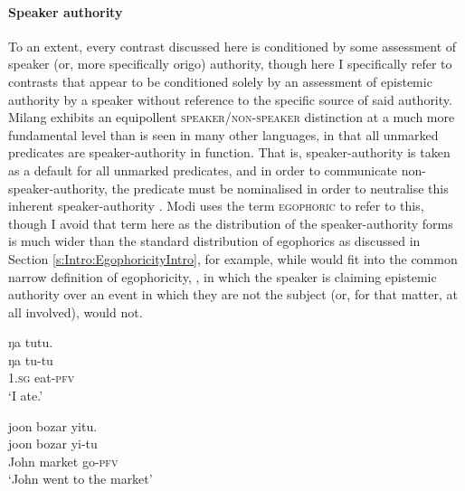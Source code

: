 \paragraph{Speaker authority}
To an extent, every contrast discussed here is conditioned by some assessment of speaker (or, more specifically origo) authority, though here I specifically refer to contrasts that appear to be conditioned solely by an assessment of epistemic authority by a speaker without reference to the specific source of said authority.
Milang \cite[Siangic: India,][]{Modi2017} exhibits an equipollent \textsc{speaker}/\textsc{non-speaker} distinction at a much more fundamental level than is seen in many other languages, in that all unmarked predicates are speaker-authority in function. That is, speaker-authority is taken as a default for all unmarked predicates, and in order to communicate non-speaker-authority, the predicate must be nominalised in order to neutralise this inherent speaker-authority \cite[455]{Modi2017}. Modi uses the term \textsc{egophoric} to refer to this, though I avoid that term here as the distribution of the speaker-authority forms is much wider than the standard distribution of egophorics as discussed in Section \ref{s:Intro:EgophoricityIntro}, for example, while  would fit into the common narrow definition of egophoricity, , in which the speaker is claiming epistemic authority over an event in which they are not the subject (or, for that matter, at all involved), would not.

\begin{exe}
        \ex\label{e:Description:MilangEgo}
        \begin{xlist}
        \ex \label{e:Description:MilangEgo1}
        \glll ŋa tutu. \\
        ŋa tu-tu \\
         1.\textsc{sg} eat-\textsc{pfv} \\
         \glt `I ate.' \\
         \cite[Milang,][455]{Modi2017}

        \ex \label{e:Description:MilangEgo2}
        \glll joon bozar yitu. \\
        joon bozar yi-tu \\
        John market go-\textsc{pfv} \\
        \glt `John went to the market' \\
        \cite[Milang,][456]{Modi2017}
        \end{xlist}
        
\end{exe}

